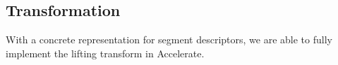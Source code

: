 %


\subsection{Transformation}
With a concrete representation for segment descriptors, we are able to fully implement the lifting transform in Accelerate.

